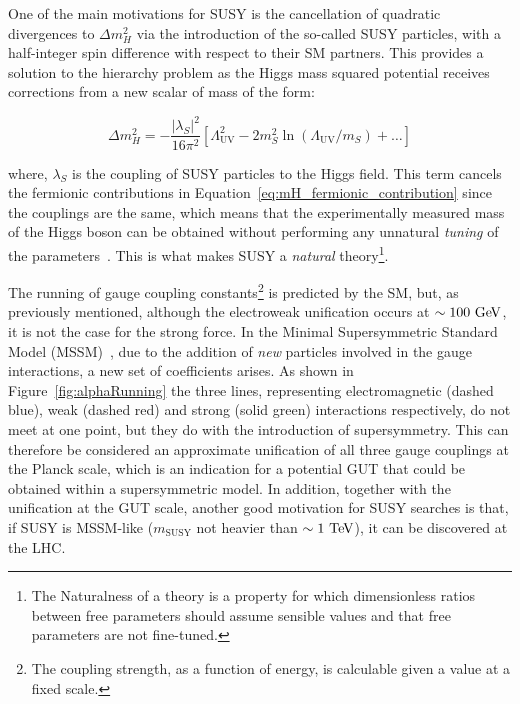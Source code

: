 		One of the main motivations for \ac{SUSY} is the cancellation of quadratic divergences to $\Delta m_H^2$ via the introduction of the so-called \ac{SUSY} particles, with a half-integer spin difference with respect to their \ac{SM} partners. This provides a solution to the hierarchy problem as the Higgs mass squared potential receives corrections from a new scalar of mass of the form:

		\begin{equation}
		\label{eq:mH_scalar_contribution}
			\Delta m_H^2 = - \frac{\left | \lambda_S \right |^2}{16 \pi ^2} \left [  \Lambda_{\mathrm{UV}}^2 - 2m_S^2 \ln \left (\Lambda_{\mathrm{UV}} / m_S \right) + \dots \right ]
		\end{equation}

		\noindent where, $\lambda_S$ is the coupling of \ac{SUSY} particles to the Higgs field. This term cancels the fermionic contributions in Equation~\ref{eq:mH_fermionic_contribution} since the couplings are the same, which means that the experimentally measured mass of the Higgs boson can be obtained without performing any unnatural \emph{tuning} of the parameters~\cite{susyprimer,Barbieri:1987fn}. This is what makes \ac{SUSY} a \emph{natural} theory\footnote{The Naturalness of a theory is a property for which dimensionless ratios between free parameters should assume sensible values and that free parameters are not fine-tuned.}.

		The running of gauge coupling constants\footnote{The coupling strength, as a function of energy, is calculable given a value at a fixed scale.} is predicted by the \ac{SM}, but, as previously mentioned, although the electroweak unification occurs at $\sim 100 \GeV$, it is not the case for the strong force. In the Minimal Supersymmetric Standard Model (MSSM)~\cite{Jegerlehner:2013nna}, due to the addition of \emph{new} particles involved in the gauge interactions, a new set of coefficients arises. As shown in Figure~\ref{fig:alphaRunning} the three lines, representing electromagnetic (dashed blue), weak (dashed red) and strong (solid green) interactions respectively, do not meet at one point, but they do with the introduction of supersymmetry. This can therefore be considered an approximate unification of all three gauge couplings at the Planck scale, which is an indication for a potential \ac{GUT} that could be obtained within a supersymmetric model. In addition, together with the unification at the \ac{GUT} scale, another good motivation for \ac{SUSY} searches is that, if \ac{SUSY} is \ac{MSSM}-like ($m_{\mathrm{SUSY}}$ not heavier than $\sim 1 \TeV$), it can be discovered at the \ac{LHC}.  
	
